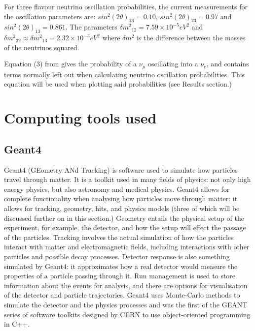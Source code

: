 \documentclass[11pt,oneside,a4paper]{article}
\begin{document}
For three flavour neutrino oscillation probabilities, the current measurements for the oscillation parameters are: $sin^2(2\theta)_{13} = 0.10$, $sin^2(2\theta)_{23} = 0.97$ and $sin^2(2\theta)_{13} = 0.861$. The parameters $\delta{m^2}_{12} = 7.59 \times 10^{−5} eV^2$ and $\delta{m^2}_{32} \approx \delta{m^2}_{13} = 2.32 \times 10^{−3} eV^2$ where $\delta{m^2}$ is the difference between the masses of the neutrinos squared.

Equation (3) from \cite{probcomponents} gives the probability of a $\nu_{\mu}$ oscillating into a $\nu_e$, and contains terms normally left out when calculating neutrino oscillation probabilities. This equation will be used when plotting said probabilities (see Results section.)



\section{Computing tools used}

\subsection{Geant4}
Geant4 (GEometry ANd Tracking) is software used to simulate how particles travel through matter. \cite{geant4paper} It is a toolkit used in many fields of physics: not only high energy physics, but also astronomy and medical physics. Geant4 allows for complete functionality when analysing how particles move through matter: it allows for tracking, geometry, hits, and physics models (three of which will be discussed further on in this section.) Geometry entails the physical setup of the experiment, for example, the detector, and how the setup will effect the passage of the particles. Tracking involves the actual simulation of how the particles interact with matter and electromagnetic fields, including interactions with other particles and possible decay processes. Detector response is also something simulated by Geant4: it approximates how a real detector would measure the properties of a particle passing through it. Run management is used to store information about the events for analysis, and there are options for visualisation of the detector and particle trajectories. Geant4 uses Monte-Carlo methods to simulate the detector and the physics processes and was the first of the GEANT series of software toolkits designed by CERN to use object-oriented programming in C++.\cite{geant4paper}
\end{document}
